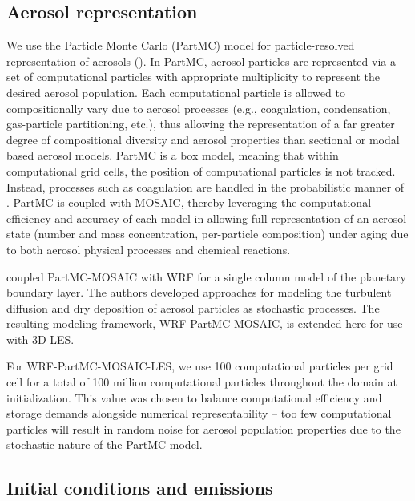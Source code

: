 \subsection{Aerosol representation}

We use the Particle Monte Carlo (PartMC) model for particle-resolved representation of aerosols (\cite{riemer_simulating_2009}). In PartMC, aerosol particles are represented via a set of computational particles with appropriate multiplicity to represent the desired aerosol population. Each computational particle is allowed to compositionally vary due to aerosol processes (e.g., coagulation, condensation, gas-particle partitioning, etc.), thus allowing the representation of a far greater degree of compositional diversity and aerosol properties than sectional or modal based aerosol models. PartMC is a box model, meaning that within computational grid cells, the position of computational particles is not tracked. Instead, processes such as coagulation are handled in the probabilistic manner of \cite{gillespie_exact_1975}. PartMC is coupled with MOSAIC, thereby leveraging the computational efficiency and accuracy of each model in allowing full representation of an aerosol state (number and mass concentration, per-particle composition) under aging due to both aerosol physical processes and chemical reactions.

\cite{curtis_single-column_2017} coupled PartMC-MOSAIC with WRF for a single column model of the planetary boundary layer. The authors developed approaches for modeling the turbulent diffusion and dry deposition of aerosol particles as stochastic processes. The resulting modeling framework, WRF-PartMC-MOSAIC, is extended here for use with 3D LES. 

For WRF-PartMC-MOSAIC-LES, we use 100 computational particles per grid cell for a total of 100 million computational particles throughout the domain at initialization. This value was chosen to balance computational efficiency and storage demands alongside numerical representability -- too few computational particles will result in random noise for aerosol population properties due to the stochastic nature of the PartMC model.

\subsection{Initial conditions and emissions}

